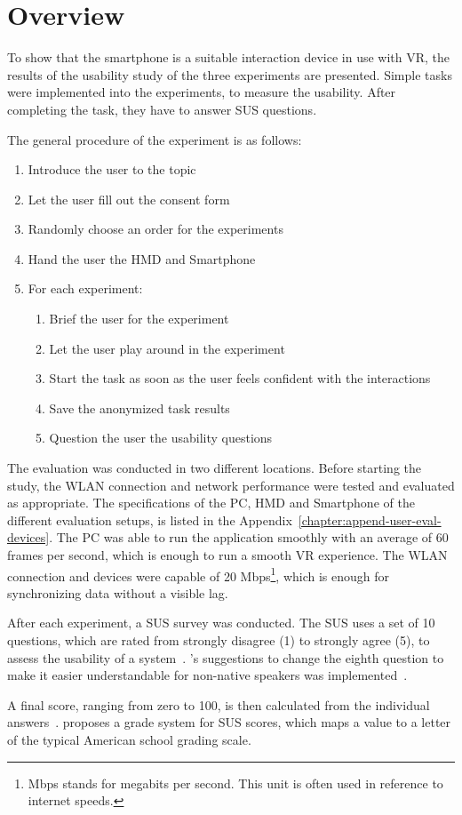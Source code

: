 \section{Overview}\label{section:evaluation-overview}

To show that the smartphone is a suitable interaction device in use with \ac{VR}, the results of the usability study of the three experiments are presented. Simple tasks were implemented into the experiments, to measure the usability. After completing the task, they have to answer \ac{SUS} questions.

The general procedure of the experiment is as follows:
\begin{enumerate}
  \item Introduce the user to the topic
  \item Let the user fill out the consent form
  \item Randomly choose an order for the experiments
  \item Hand the user the \ac{HMD} and Smartphone
  \item For each experiment:
  \begin{enumerate}
  \item Brief the user for the experiment
  \item Let the user play around in the experiment
  \item Start the task as soon as the user feels confident with the interactions
  \item Save the anonymized task results
  \item Question the user the usability questions
  \end{enumerate}
\end{enumerate}

The evaluation was conducted in two different locations. Before starting the study, the \ac{WLAN} connection and network performance were tested and evaluated as appropriate. The specifications of the \ac{PC}, \ac{HMD} and Smartphone of the different evaluation setups, is listed in the Appendix~\ref{chapter:append-user-eval-devices}. The \ac{PC} was able to run the application smoothly with an average of 60 frames per second, which is enough to run a smooth \ac{VR} experience. The \ac{WLAN} connection and devices were capable of 20 Mbps\footnote{Mbps stands for megabits per second. This unit is often used in reference to internet speeds.}, which is enough for synchronizing data without a visible lag.

After each experiment, a \ac{SUS} survey was conducted. The \acf{SUS} uses a set of 10 questions, which are rated from strongly disagree (1) to strongly agree (5), to assess the usability of a system~\cite[3]{Brooke.1996}. \citeauthor{Finstad.2006}'s suggestions to change the eighth question to make it easier understandable for non-native speakers was implemented~\cite[188]{Finstad.2006}. 

A final score, ranging from zero to 100, is then calculated from the individual answers~\cite{Brooke.1996}. \citeauthor{Bangor.2009} proposes a grade system for \ac{SUS} scores, which maps a value to a letter of the typical American school grading scale.